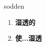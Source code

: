 
\begin{frame}
{\huge sodden}
\begin{center}
\begin{enumerate}\Large
  \item \textbf{湿透的}
  \item \textbf{使...湿透}
\end{enumerate}
\end{center}
\end{frame}
